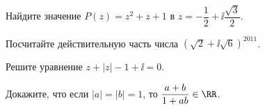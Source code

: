 %
%


\begin{problems}

\item
Найдите значение $P(z) = z^2 + z + 1$ в
$z = - \dfrac{1}{2} + \ii \dfrac{\sqrt{3}}{2}$.

\item
Посчитайте действительную часть числа
$\left(\sqrt{2} + \ii \sqrt{6}\right)^{2011}$.

\item
Решите уравнение
$z + |z| - 1 + \ii = 0$.

\item
Докажите, что если
$|a| = |b| = 1$,
то
$\dfrac{a + b}{1 + a b} \in \RR$.

\end{problems}

